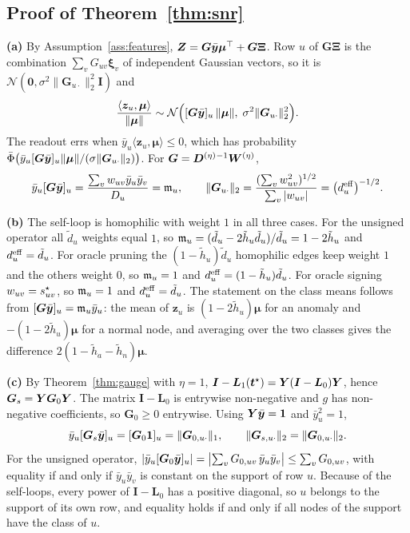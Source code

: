 \subsection{Proof of Theorem~\ref{thm:snr}}
\textbf{(a)} By Assumption~\ref{ass:features}, $\bm Z=\bm G\bar{\bm{y}}\bm\mu^{\top}+\bm G\bm\Xi$.
Row $u$ of $\bm G\bm\Xi$ is the combination $\sum_vG_{uv}\bm\xi_v$ of independent Gaussian vectors, so it is $\mathcal N(\bm 0,\sigma^2\|\bm G_{u\cdot}\|_2^2\bm I)$ and
\[
\frac{\langle\bm z_u,\bm\mu\rangle}{\|\bm\mu\|}\sim\mathcal N\Bigl([\bm G\bar{\bm{y}}]_u\,\|\bm\mu\|,\;\sigma^2\|\bm G_{u\cdot}\|_2^2\Bigr).
\]
The readout errs when $\bar y_u\langle\bm z_u,\bm\mu\rangle\le0$, which has probability $\bar{\Phi}\bigl(\bar y_u[\bm G\bar{\bm{y}}]_u\|\bm\mu\|/(\sigma\|\bm G_{u\cdot}\|_2)\bigr)$.
For $\bm G=\bm{D}^{(\eta)}{}^{-1}\bm{W}^{(\eta)}$,
\[
\bar y_u[\bm G\bar{\bm{y}}]_u=\frac{\sum_vw_{uv}\bar y_u\bar y_v}{D_u}=\mathfrak{m}_u,
\qquad
\|\bm G_{u\cdot}\|_2=\frac{(\sum_vw_{uv}^2)^{1/2}}{\sum_v|w_{uv}|}=\bigl(d^{\mathrm{eff}}_u\bigr)^{-1/2}.
\]

\noindent\textbf{(b)} The self-loop is homophilic with weight $1$ in all three cases.
For the unsigned operator all $\tilde d_u$ weights equal $1$, so $\mathfrak{m}_u=(\tilde d_u-2\tilde h_u\tilde d_u)/\tilde d_u=1-2\tilde h_u$ and $d^{\mathrm{eff}}_u=\tilde d_u$.
For oracle pruning the $(1-\tilde h_u)\tilde d_u$ homophilic edges keep weight $1$ and the others weight $0$, so $\mathfrak{m}_u=1$ and $d^{\mathrm{eff}}_u=(1-\tilde h_u)\tilde d_u$.
For oracle signing $w_{uv}=s^{\star}_{uv}$, so $\mathfrak{m}_u=1$ and $d^{\mathrm{eff}}_u=\tilde d_u$.
The statement on the class means follows from $[\bm G\bar{\bm{y}}]_u=\mathfrak{m}_u\bar y_u$: the mean of $\bm z_u$ is $(1-2\tilde h_u)\bm\mu$ for an anomaly and $-(1-2\tilde h_u)\bm\mu$ for a normal node, and averaging over the two classes gives the difference $2(1-\tilde h_a-\tilde h_n)\bm\mu$.

\noindent\textbf{(c)} By Theorem~\ref{thm:gauge} with $\eta=1$, $\bm I-\bm L_1(\bm t^\star)=\bm{Y}(\bm I-\bm L_0)\bm{Y}$, hence $\bm G_s=\bm{Y}\bm G_0\bm{Y}$.
The matrix $\bm I-\bm L_0$ is entrywise non-negative and $g$ has non-negative coefficients, so $\bm G_0\ge0$ entrywise.
Using $\bm{Y}\bar{\bm{y}}=\bm 1$ and $\bar y_u^2=1$,
\[
\bar y_u[\bm G_s\bar{\bm{y}}]_u=[\bm G_0\bm 1]_u=\|\bm G_{0,u\cdot}\|_1,
\qquad
\|\bm G_{s,u\cdot}\|_2=\|\bm G_{0,u\cdot}\|_2.
\]
For the unsigned operator, $|\bar y_u[\bm G_0\bar{\bm{y}}]_u|=\bigl|\sum_vG_{0,uv}\,\bar y_u\bar y_v\bigr|\le\sum_vG_{0,uv}$, with equality if and only if $\bar y_u\bar y_v$ is constant on the support of row $u$.
Because of the self-loops, every power of $\bm I-\bm L_0$ has a positive diagonal, so $u$ belongs to the support of its own row, and equality holds if and only if all nodes of the support have the class of $u$.

